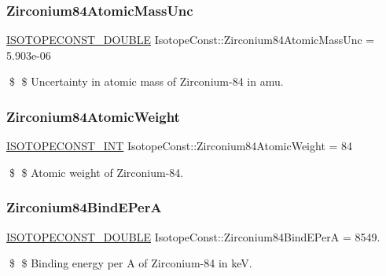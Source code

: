 \subsubsection{\texorpdfstring{Zirconium84\+Atomic\+Mass\+Unc}{Zirconium84AtomicMassUnc}}
{\footnotesize\ttfamily \mbox{\hyperlink{group___isotope_const-_macros_ga8f45a7272ce02c0b4c65c44636ed719a}{I\+S\+O\+T\+O\+P\+E\+C\+O\+N\+S\+T\+\_\+\+D\+O\+U\+B\+LE}} Isotope\+Const\+::\+Zirconium84\+Atomic\+Mass\+Unc = 5.\+903e-\/06}

\$ \$ Uncertainty in atomic mass of Zirconium-\/84 in amu. \mbox{\label{group___isotope_const-_zirconium-_zr84_ga4d53ccb1722d96ecf4b55445ead63ced}} 
\subsubsection{\texorpdfstring{Zirconium84\+Atomic\+Weight}{Zirconium84AtomicWeight}}
{\footnotesize\ttfamily \mbox{\hyperlink{group___isotope_const-_macros_ga5f18360b3e99483a35c32d789e62621c}{I\+S\+O\+T\+O\+P\+E\+C\+O\+N\+S\+T\+\_\+\+I\+NT}} Isotope\+Const\+::\+Zirconium84\+Atomic\+Weight = 84}

\$ \$ Atomic weight of Zirconium-\/84. \mbox{\label{group___isotope_const-_zirconium-_zr84_gae4913a92547f680cab681e8e32689858}} 
\subsubsection{\texorpdfstring{Zirconium84\+Bind\+E\+PerA}{Zirconium84BindEPerA}}
{\footnotesize\ttfamily \mbox{\hyperlink{group___isotope_const-_macros_ga8f45a7272ce02c0b4c65c44636ed719a}{I\+S\+O\+T\+O\+P\+E\+C\+O\+N\+S\+T\+\_\+\+D\+O\+U\+B\+LE}} Isotope\+Const\+::\+Zirconium84\+Bind\+E\+PerA = 8549.}

\$ \$ Binding energy per A of Zirconium-\/84 in keV. \mbox{\label{group___isotope_const-_zirconium-_zr84_ga86c7943050eb785353472bf99df56575}} 
